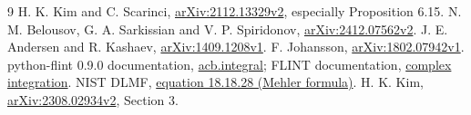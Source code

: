 \documentclass[11pt,a4paper]{article}
\begin{document}
\begin{thebibliography}{9}\small
{} H. K. Kim and C. Scarinci,
\href{https://arxiv.org/abs/2112.13329v2}{arXiv:2112.13329v2},
especially Proposition 6.15.
 N. M. Belousov, G. A. Sarkissian and V. P. Spiridonov,
\href{https://arxiv.org/abs/2412.07562v2}{arXiv:2412.07562v2}.
 J. E. Andersen and R. Kashaev,
\href{https://arxiv.org/abs/1409.1208v1}{arXiv:1409.1208v1}.
 F. Johansson,
\href{https://arxiv.org/abs/1802.07942v1}{arXiv:1802.07942v1}.
 python-flint 0.9.0 documentation,
\href{https://python-flint.readthedocs.io/en/latest/acb.html}{acb.integral};
FLINT documentation, \href{https://arblib.org/acb_calc.html}{complex integration}.
 NIST DLMF,
\href{https://dlmf.nist.gov/18.18.E28}{equation 18.18.28 (Mehler formula)}.
 H. K. Kim,
\href{https://arxiv.org/abs/2308.02934v2}{arXiv:2308.02934v2}, Section 3.
\end{thebibliography}
\end{document}
